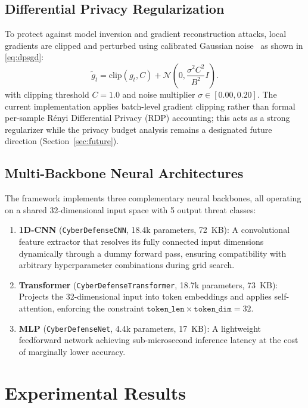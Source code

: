 \documentclass[journal,10pt,twocolumn]{IEEEtran}
\begin{document}
\subsection{Differential Privacy Regularization}
To protect against model inversion and gradient reconstruction attacks, local gradients are clipped and perturbed using calibrated Gaussian noise~\cite{abadi2016deep} as shown in \eqref{eq:dpsgd}:
\begin{equation}
\tilde{g}_t = \text{clip}(g_t, C) + \mathcal{N}\left(0, \frac{\sigma^2 C^2}{B^2} I\right).
\label{eq:dpsgd}
\end{equation}
with clipping threshold $C = 1.0$ and noise multiplier $\sigma \in [0.00, 0.20]$. The current implementation applies batch-level gradient clipping rather than formal per-sample Rényi Differential Privacy (RDP) accounting; this acts as a strong regularizer while the privacy budget analysis remains a designated future direction (Section~\ref{sec:future}).

\subsection{Multi-Backbone Neural Architectures}
The framework implements three complementary neural backbones, all operating on a shared 32-dimensional input space with 5 output threat classes:
\begin{enumerate}
    \item \textbf{1D-CNN} (\texttt{CyberDefenseCNN}, 18.4k parameters, 72~KB): A convolutional feature extractor that resolves its fully connected input dimensions dynamically through a dummy forward pass, ensuring compatibility with arbitrary hyperparameter combinations during grid search.
    \item \textbf{Transformer} (\texttt{CyberDefenseTransformer}, 18.7k parameters, 73~KB): Projects the 32-dimensional input into token embeddings and applies self-attention, enforcing the constraint $\texttt{token\_len} \times \texttt{token\_dim} = 32$.
    \item \textbf{MLP} (\texttt{CyberDefenseNet}, 4.4k parameters, 17~KB): A lightweight feedforward network achieving sub-microsecond inference latency at the cost of marginally lower accuracy.
\end{enumerate}

\section{Experimental Results}
\end{document}
